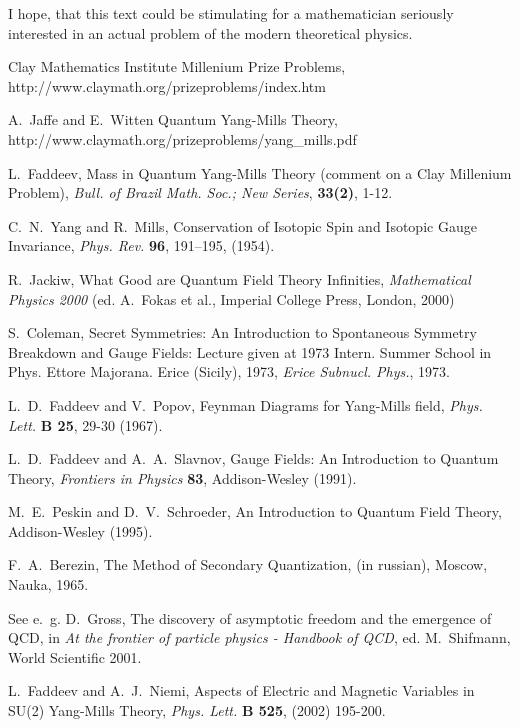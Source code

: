 \documentclass[12pt]{article}
\begin{document}
	I hope, that this text could be stimulating for a mathematician
	seriously interested in an actual problem of the modern
	theoretical physics.

\begin{thebibliography}{99}

        Clay Mathematics Institute Millenium Prize Problems,\\
        http://www.claymath.org/prizeproblems/index.htm

        A.~Jaffe and E.~Witten Quantum Yang-Mills Theory,\\
        http://www.claymath.org/prizeproblems/yang\_mills.pdf

	L.~Faddeev, Mass in Quantum Yang-Mills Theory
	(comment on a Clay Millenium Problem),
	{\it Bull. of Brazil Math. Soc.; New Series}, {\bf 33(2)}, 1-12.

        C.~N.~Yang and R.~Mills, Conservation of Isotopic Spin and
        Isotopic Gauge Invariance, {\it Phys. Rev.} {\bf 96}, 191--195,
        (1954).

        R.~Jackiw, What Good are Quantum Field Theory Infinities,
        {\it Mathematical Physics 2000}
        (ed. A.~Fokas et al., Imperial College Press, London, 2000)

        S.~Coleman, Secret Symmetries: An Introduction to Spontaneous
        Symmetry Breakdown and Gauge Fields: Lecture given at 1973
        Intern. Summer School in Phys. Ettore Majorana. Erice (Sicily),
        1973, {\it Erice Subnucl. Phys.}, 1973.

	L.~D.~Faddeev and V.~Popov, Feynman Diagrams for Yang-Mills
	field, {\it Phys. Lett.} {\bf B 25}, 29-30 (1967).

        L.~D.~Faddeev and A.~A.~Slavnov, Gauge Fields: An Introduction
	to Quantum Theory, {\it Frontiers in Physics} {\bf 83},
	Addison-Wesley (1991).

        M.~E.~Peskin and D.~V.~Schroeder, An Introduction to
        Quantum Field Theory, Addison-Wesley (1995).

        F.~A.~Berezin, The Method of Secondary Quantization,
	(in russian), Moscow, Nauka, 1965.

	See e.~g.
	D.~Gross, The discovery of asymptotic freedom and the emergence
	of QCD, in {\it At the frontier of particle physics - Handbook
	of QCD}, ed. M.~Shifmann, World Scientific 2001.

	L.~Faddeev and A.~J.~Niemi, Aspects of Electric and Magnetic 
	Variables in SU(2) Yang-Mills Theory,
	{\it Phys. Lett.} {\bf B 525}, (2002) 195-200.



\end{thebibliography}
\end{document}
